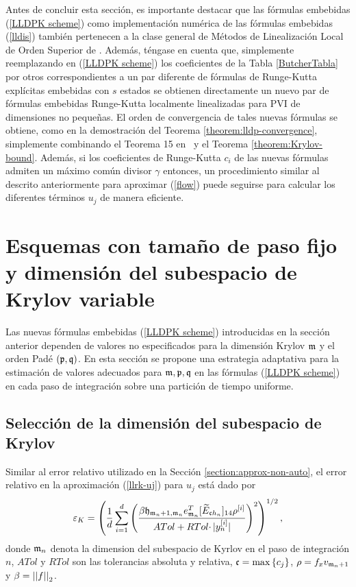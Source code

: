 Antes de concluir esta sección, es importante destacar que las fórmulas embebidas (\ref{LLDPK scheme}) como implementación numérica de las fórmulas embebidas (\ref{lldis}) también pertenecen a la clase general de Métodos de Linealización Local de Orden Superior de \cite{Jimenez13}. Además, téngase en cuenta que, simplemente reemplazando en (\ref{LLDPK scheme}) los coeficientes de la Tabla \ref{ButcherTabla} por otros correspondientes a un par diferente de fórmulas de Runge-Kutta explícitas embebidas con $s$ estados se obtienen directamente un nuevo par de fórmulas embebidas Runge-Kutta localmente linealizadas para PVI de dimensiones no pequeñas. El orden de convergencia de tales nuevas fórmulas se obtiene, como en la demostración del Teorema \ref{theorem:lldp-convergence}, simplemente combinando el Teorema 15 en~\cite{Jimenez13} y el Teorema \ref{theorem:Krylov-bound}. Además, si los coeficientes de Runge-Kutta $c_i$ de las nuevas fórmulas admiten un máximo común divisor $\gamma$ entonces, un procedimiento similar al descrito anteriormente para aproximar (\ref{flow}) puede seguirse para calcular los diferentes términos $u_j$ de manera eficiente.

\section{Esquemas con tamaño de paso fijo y dimensión del subespacio de Krylov variable}\label{section:lldp-fix-step}

Las nuevas fórmulas embebidas (\ref{LLDPK scheme}) introducidas en la sección anterior dependen de valores no especificados para la dimensión Krylov $\mathfrak{m}$ y el orden Padé $(\mathfrak{p} ,\mathfrak{q})$. En esta sección se propone una estrategia adaptativa para la estimación de valores adecuados para $\mathfrak{m}, \mathfrak{p} ,\mathfrak{q}$ en las fórmulas (\ref{LLDPK scheme}) en cada paso de integración sobre una partición de tiempo uniforme.

\subsection{Selección de la dimensión del subespacio de Krylov}\label{sec:selkrydim}

Similar al error relativo utilizado en la Sección \ref{section:approx-non-auto}, el error relativo en la aproximación (\ref{llrk-uj}) para $u_j$ está dado por
\begin{equation}
    \varepsilon_{K} = \left(\frac{1}{d}\sum\limits_{i=1}^{d} \left(\frac{\beta
        \mathfrak{h}_{\mathfrak{m}_n+1,\mathfrak{m}_n} e_{\mathfrak{m}_n}^T
        [\widetilde{E}_{\mathfrak{c}h_n}]_{14} \rho^{[i]}}{ATol+ RTol\cdotp
        \rvert y_{n}^{[i]}\rvert}\right)^{2}\right)^{1/2},
    \label{errrel}
\end{equation}
donde $\mathfrak{m}_n$ denota la dimension del subespacio de Kyrlov en el paso de integración $n$, $ATol$ y $RTol$ son las tolerancias absoluta y relativa, $\mathfrak{c}=\max\left\{ c_j \right\}$, $\rho = f_x v_{\mathfrak{m}_n+1}$ y $\beta=\left\lvert \left\lvert f \right\rvert \right\rvert_2$.

